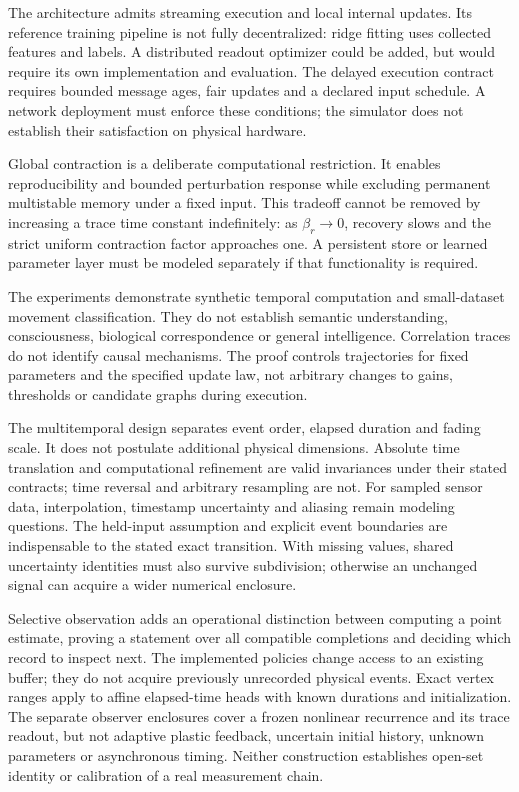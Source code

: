 \documentclass[11pt,a4paper]{article}
\theoremstyle{definition}\newtheorem{definition}[theorem]{Definition}
\begin{document}
The architecture admits streaming execution and local internal updates. Its reference training pipeline is not fully decentralized: ridge fitting uses collected features and labels. A distributed readout optimizer could be added, but would require its own implementation and evaluation. The delayed execution contract requires bounded message ages, fair updates and a declared input schedule. A network deployment must enforce these conditions; the simulator does not establish their satisfaction on physical hardware.

Global contraction is a deliberate computational restriction. It enables reproducibility and bounded perturbation response while excluding permanent multistable memory under a fixed input. This tradeoff cannot be removed by increasing a trace time constant indefinitely: as $\beta_r\to0$, recovery slows and the strict uniform contraction factor approaches one. A persistent store or learned parameter layer must be modeled separately if that functionality is required.

The experiments demonstrate synthetic temporal computation and small-dataset movement classification. They do not establish semantic understanding, consciousness, biological correspondence or general intelligence. Correlation traces do not identify causal mechanisms. The proof controls trajectories for fixed parameters and the specified update law, not arbitrary changes to gains, thresholds or candidate graphs during execution.

The multitemporal design separates event order, elapsed duration and fading scale. It does not postulate additional physical dimensions. Absolute time translation and computational refinement are valid invariances under their stated contracts; time reversal and arbitrary resampling are not. For sampled sensor data, interpolation, timestamp uncertainty and aliasing remain modeling questions. The held-input assumption and explicit event boundaries are indispensable to the stated exact transition. With missing values, shared uncertainty identities must also survive subdivision; otherwise an unchanged signal can acquire a wider numerical enclosure.

Selective observation adds an operational distinction between computing a point estimate, proving a statement over all compatible completions and deciding which record to inspect next. The implemented policies change access to an existing buffer; they do not acquire previously unrecorded physical events. Exact vertex ranges apply to affine elapsed-time heads with known durations and initialization. The separate observer enclosures cover a frozen nonlinear recurrence and its trace readout, but not adaptive plastic feedback, uncertain initial history, unknown parameters or asynchronous timing. Neither construction establishes open-set identity or calibration of a real measurement chain.
\end{document}
